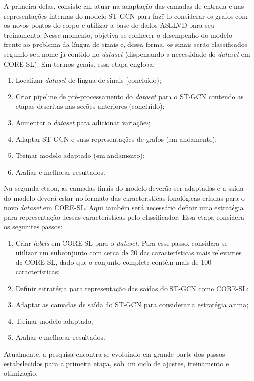 A primeira delas, consiste em atuar na adaptação das camadas de entrada e nas representações internas do modelo ST-GCN para fazê-lo considerar os grafos com os novos pontos do corpo e utilizar a base de dados ASLLVD para seu treinamento. Nesse momento, objetiva-se conhecer o desempenho do modelo frente ao problema da língua de sinais e, dessa forma, os sinais serão classificados segundo seu nome já contido no \textit{dataset} (dispensando a necessidade do \textit{dataset} em CORE-SL). Em termos gerais, essa etapa engloba:
\begin{enumerate}
    \item Localizar \textit{dataset} de língua de sinais (concluído);
    \item Criar pipeline de pré-processamento do \textit{dataset} para o ST-GCN contendo as etapas descritas nas seções anteriores (concluído);
    \item Aumentar o \textit{dataset} para adicionar variações;
    \item Adaptar ST-GCN e suas representações de grafos (em andamento);
    \item Treinar modelo adaptado (em andamento);
    \item Avaliar e melhorar resultados.
\end{enumerate}

Na segunda etapa, as camadas finais do modelo deverão ser adaptadas e a saída do modelo deverá estar no formato das características fonológicas criadas para o novo \textit{dataset} em CORE-SL. Aqui também será necessário definir uma estratégia para representação dessas características pelo classificador. Essa etapa considera os seguintes passos:
\begin{enumerate}
    \item Criar \textit{labels} em CORE-SL para o \textit{dataset}. Para esse passo, considera-se utilizar um subconjunto com cerca de 20 das características mais relevantes do CORE-SL, dado que o conjunto completo contém mais de 100 características;
    \item Definir estratégia para representação das saídas do ST-GCN como CORE-SL;
    \item Adaptar as camadas de saída do ST-GCN para considerar a estratégia acima;
    \item Treinar modelo adaptado;
    \item Avaliar e melhorar resultados.
\end{enumerate}

Atualmente, a pesquisa encontra-se evoluindo em grande parte dos passos estabelecidos para a primeira etapa, sob um ciclo de ajustes, treinamento e otimização.






